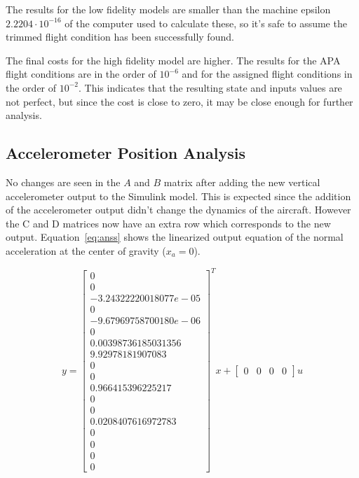 The results for the low fidelity models are smaller than the machine epsilon $2.2204\cdot10^{-16}$ of the computer used to calculate these, so it's safe to assume the trimmed flight condition has been successfully found. 

The final costs for the high fidelity model are higher. The results for the APA flight conditions are in the order of $10^{-6}$ and for the assigned flight conditions in the order of $10^{-2}$. This indicates that the resulting state and inputs values are not perfect, but since the cost is close to zero, it may be close enough for further analysis.


\subsection{Accelerometer Position Analysis}
No changes are seen in the $A$ and $B$ matrix after adding the new vertical accelerometer output to the Simulink model. This is expected since the addition of the accelerometer output didn't change the dynamics of the aircraft. However the C and D matrices now have an extra row which corresponds to the new output. Equation~\ref{eq:anss} shows the linearized output equation of the normal acceleration at the center of gravity ($x_a=0$).

\begin{equation}
    \label{eq:anss}
    y = \begin{bmatrix}
        0 \\ 0 \\ -3.24322220018077e-05 \\ 0 \\ -9.67969758700180e-06 \\ 0 \\ 
        0.00398736185031356 \\ 9.92978181907083 \\ 0 \\ 0 \\ 0.966415396225217 \\ 
        0 \\ 0 \\ 0.0208407616972783 \\ 0 \\ 0 \\ 0 \\ 0
        \end{bmatrix}^T x + 
        \begin{bmatrix}
        0 & 0 & 0 & 0
    \end{bmatrix} u
\end{equation}

